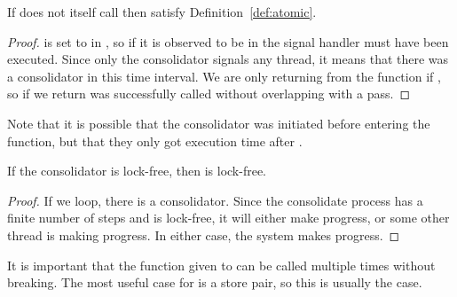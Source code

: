 \begin{theorem}
  If  does not itself call  then  satisfy
  Definition~\ref{def:atomic}.
\end{theorem}
\begin{proof}
   is set to  in , so if it is observed to be
   in  the signal handler must have been executed. Since only the consolidator
  signals any thread, it means that there was a consolidator in this time interval. We are only
  returning from the function if , so if we return  was
  successfully called without overlapping with a pass.
\end{proof}
Note that it is possible that the consolidator was initiated before entering the 
function, but that they only got execution time after .
\begin{lemma}
  If the consolidator is lock-free, then  is lock-free.
\end{lemma}
\begin{proof}
  If we loop, there is a consolidator. Since the consolidate process has a finite number of steps
  and is lock-free, it will either make progress, or some other thread is making progress. In
  either case, the system makes progress.
\end{proof}

It is important that the function given to  can be called multiple times without
breaking. The most useful case for  is a  store pair, so this is
usually the case.

